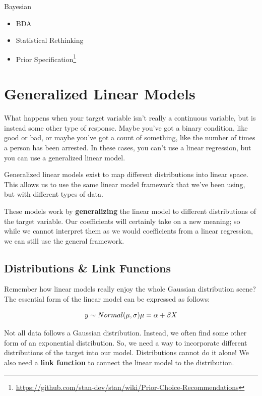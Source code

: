 \documentclass[
  letterpaper,
]{krantz}
\providecommand{\tightlist}{%
  \setlength{\itemsep}{0pt}\setlength{\parskip}{0pt}}\usepackage{longtable,booktabs,array}
\DeclareRobustCommand{\href}[2]{#2\footnote{\url{#1}}}
\begin{document}
Bayesian

\begin{itemize}
\tightlist
\item
  BDA
\item
  Statistical Rethinking
\item
  \href{https://github.com/stan-dev/stan/wiki/Prior-Choice-Recommendations}{Prior
  Specification}
\end{itemize}

\chapter{Generalized Linear Models}\label{generalized-linear-models}

What happens when your target variable isn't really a continuous
variable, but is instead some other type of response. Maybe you've got a
binary condition, like good or bad, or maybe you've got a count of
something, like the number of times a person has been arrested. In these
cases, you can't use a linear regression, but you can use a generalized
linear model.

Generalized linear models exist to map different distributions into
linear space. This allows us to use the same linear model framework that
we've been using, but with different types of data.

These models work by \textbf{generalizing} the linear model to different
distributions of the target variable. Our coefficients will certainly
take on a new meaning; so while we cannot interpret them as we would
coefficients from a linear regression, we can still use the general
framework.

\section{Distributions \& Link
Functions}\label{distributions-link-functions}

Remember how linear models really enjoy the whole Gaussian distribution
scene? The essential form of the linear model can be expressed as
follows:

\[y \sim Normal(\mu,\sigma) \\ \mu = \alpha + \beta X\]

Not all data follows a Gaussian distribution. Instead, we often find
some other form of an exponential distribution. So, we need a way to
incorporate different distributions of the target into our model.
Distributions cannot do it alone! We also need a \textbf{link function}
to connect the linear model to the distribution.
\end{document}

